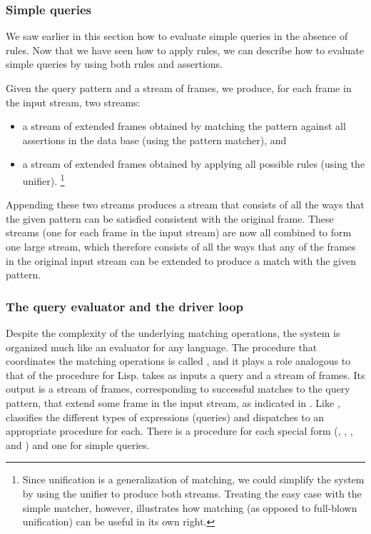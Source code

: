 \subsubsection*{Simple queries}

We saw earlier in this section how to evaluate simple queries in the absence of rules.
Now that we have seen how to apply rules, we can describe how to evaluate simple queries by using both rules and assertions.

Given the query pattern and a stream of frames, we produce, for each frame in the input stream, two streams:
\begin{itemize}

	\item
		a stream of extended frames obtained by matching the pattern against all assertions in the data base (using the pattern matcher), and

	\item
		a stream of extended frames obtained by applying all possible rules (using the unifier).%
		\footnote{
			Since unification is a generalization of matching, we could simplify the system by using the unifier to produce both streams.
			Treating the easy case with the simple matcher, however, illustrates how matching (as opposed to full-blown unification) can be useful in its own right.
		}

\end{itemize}
Appending these two streams produces a stream that consists of all the ways that the given pattern can be satisfied consistent with the original frame.
These streams (one for each frame in the input stream) are now all combined to form one large stream, which therefore consists of all the ways that any of the frames in the original input stream can be extended to produce a match with the given pattern.



\subsubsection*{The query evaluator and the driver loop}

Despite the complexity of the underlying matching operations, the system is organized much like an evaluator for any language.
The procedure that coordinates the matching operations is called , and it plays a role analogous to that of the  procedure for Lisp.
 takes as inputs a query and a stream of frames.
Its output is a stream of frames, corresponding to successful matches to the query pattern, that extend some frame in the input stream, as indicated in .
Like ,  classifies the different types of expressions (queries) and dispatches to an appropriate procedure for each.
There is a procedure for each special form (, , , and ) and one for simple queries.

